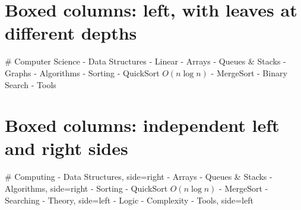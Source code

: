 \documentclass{article}
\begin{document}
\section*{Boxed columns: left, with leaves at different depths}
\begin{mindchart}[layout=left, style=boxed, equal_branch_length=true, scale=0.72]
# Computer Science
  - Data Structures
    - Linear
      - Arrays
      - Queues \& Stacks
    - Graphs
  - Algorithms
    - Sorting
      - QuickSort $O(n\log n)$
      - MergeSort
    - Binary Search
  - Tools
\end{mindchart}

\newpage
\section*{Boxed columns: independent left and right sides}
\begin{mindchart}[layout=balanced, style=boxed, equal_branch_length=true, scale=0.72]
# Computing
  - Data Structures, side=right
    - Arrays
    - Queues \& Stacks
  - Algorithms, side=right
    - Sorting
      - QuickSort $O(n\log n)$
      - MergeSort
    - Searching
  - Theory, side=left
    - Logic
    - Complexity
  - Tools, side=left
\end{mindchart}
\end{document}
